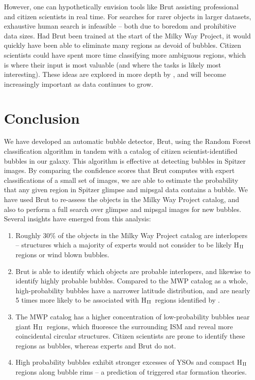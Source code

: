 \documentclass[preprint]{aastex}
\newcommand{\hii}[0]{H$_{\rm II}$}
\begin{document}
However, one can hypothetically envision tools like Brut assisting professional and citizen scientists in real time. For searches for rarer objects in larger datasets, exhaustive human search is infeasible -- both due to boredom and prohibitive data sizes. Had Brut been trained at the start of the Milky Way Project, it would quickly have been able to eliminate many regions as devoid of bubbles. Citizen scientists could have spent more time classifying more ambiguous regions, which is where their input is most valuable (and where the tasks is likely most interesting). These ideas are explored in more depth by \cite{MSR}, and will become increasingly important as data continues to grow.

\section{Conclusion}
\label{sec:conclusion}
We have developed an automatic bubble detector, Brut, using the Random Forest classification algorithm in tandem with a catalog of citizen scientist-identified bubbles in our galaxy. This algorithm is effective at detecting bubbles in Spitzer images. By comparing the confidence scores that Brut computes with expert classifications of a small set of images, we are able to estimate the probability that any given region in Spitzer {\sc glimpse} and {\sc mipsgal} data contains a bubble. We have used Brut to re-assess the objects in the Milky Way Project catalog, and also to perform a full search over {\sc glimpse} and {\sc mipsgal} images for new bubbles.  Several insights have emerged from this analysis:
\begin{enumerate}
\item Roughly 30\% of the objects in the Milky Way Project catalog are interlopers -- structures which a majority of experts would not consider to be likely \hii\, regions or wind blown bubbles.
\item Brut is able to identify which objects are probable interlopers, and likewise to identify highly probable bubbles. Compared to the MWP catalog as a whole, high-probability bubbles have a narrower latitude distribution, and are nearly 5 times more likely to be associated with \hii\, regions identified by \cite{Anderson11}.
\item The MWP catalog has a higher concentration of low-probability bubbles near giant \hii\, regions, which fluoresce the surrounding ISM and reveal more coincidental circular structures. Citizen scientists are prone to identify these regions as bubbles, whereas experts and Brut do not.
\item High probability bubbles  exhibit stronger excesses of YSOs and compact \hii\, regions along bubble rims -- a prediction of triggered star formation theories.
\end{enumerate}
\end{document}

